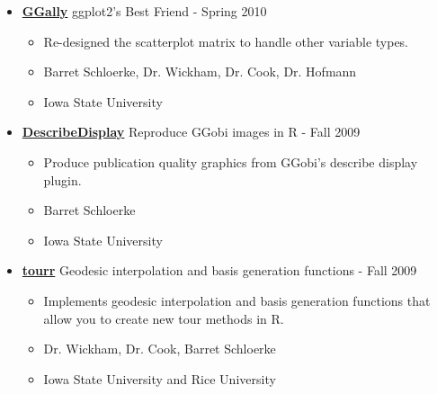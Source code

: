 \documentclass[oneside]{article}
\begin{document}
\begin{itemize}
      \item{\bf \href{http://github.com/ggobi/ggally/}{GGally}} ggplot2's Best Friend - Spring 2010
        \begin{itemize}
          \item Re-designed the scatterplot matrix to handle other variable types.
          \item Barret Schloerke, Dr. Wickham, Dr. Cook, Dr. Hofmann
          \item Iowa State University
        \end{itemize}
      
      
      
      \item{\bf \href{http://github.com/ggobi/DescribeDisplay}{DescribeDisplay}} Reproduce GGobi images in R - Fall 2009
        \begin{itemize}
          \item Produce publication quality graphics from GGobi's describe display plugin.
          \item Barret Schloerke
          \item Iowa State University
        \end{itemize}
      
      
      \item{\bf \href{http://github.com/ggobi/tourr}{tourr}} Geodesic interpolation and basis generation functions - Fall 2009
        \begin{itemize}
          \item Implements geodesic interpolation and basis generation functions that allow you to create new tour methods in R.
          \item Dr. Wickham, Dr. Cook, Barret Schloerke
          \item Iowa State University and Rice University
        \end{itemize}
      

\end{itemize}
\end{document}
